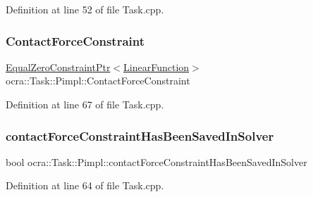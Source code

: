 Definition at line 52 of file Task.\+cpp.

\hypertarget{structocra_1_1Task_1_1Pimpl_afd9210ed3a558a170e75a7033e9ce4d8}{}\label{structocra_1_1Task_1_1Pimpl_afd9210ed3a558a170e75a7033e9ce4d8} 
\subsubsection{\texorpdfstring{Contact\+Force\+Constraint}{ContactForceConstraint}}
{\footnotesize\ttfamily \hyperlink{classocra_1_1EqualZeroConstraintPtr}{Equal\+Zero\+Constraint\+Ptr}$<$\hyperlink{classocra_1_1LinearFunction}{Linear\+Function}$>$ ocra\+::\+Task\+::\+Pimpl\+::\+Contact\+Force\+Constraint}



Definition at line 67 of file Task.\+cpp.

\hypertarget{structocra_1_1Task_1_1Pimpl_abcedfdc974f594cd0c583c2e25eda984}{}\label{structocra_1_1Task_1_1Pimpl_abcedfdc974f594cd0c583c2e25eda984} 
\subsubsection{\texorpdfstring{contact\+Force\+Constraint\+Has\+Been\+Saved\+In\+Solver}{contactForceConstraintHasBeenSavedInSolver}}
{\footnotesize\ttfamily bool ocra\+::\+Task\+::\+Pimpl\+::contact\+Force\+Constraint\+Has\+Been\+Saved\+In\+Solver}



Definition at line 64 of file Task.\+cpp.

\hypertarget{structocra_1_1Task_1_1Pimpl_a609e0fedd60809c80e0381eafd97063a}{}\label{structocra_1_1Task_1_1Pimpl_a609e0fedd60809c80e0381eafd97063a} 
